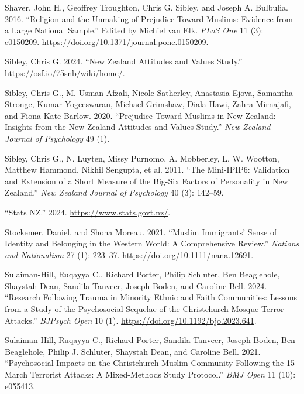\documentclass[
]{interact}
\newlength{\cslhangindent}
\newenvironment{CSLReferences}[2] %
 {\begin{list}{}{%
  \setlength{\itemindent}{0pt}
  \setlength{\leftmargin}{0pt}
  \setlength{\parsep}{0pt}
  \ifodd #1
   \setlength{\leftmargin}{\cslhangindent}
   \setlength{\itemindent}{-1\cslhangindent}
  \fi
  \setlength{\itemsep}{#2\baselineskip}}}
 {\end{list}}
\begin{document}
\begin{CSLReferences}{1}{0}
Shaver, John H., Geoffrey Troughton, Chris G. Sibley, and Joseph A.
Bulbulia. 2016. {``Religion and the Unmaking of Prejudice Toward
Muslims: Evidence from a Large National Sample.''} Edited by Michiel van
Elk. \emph{PLoS One} 11 (3): e0150209.
\url{https://doi.org/10.1371/journal.pone.0150209}.

Sibley, Chris G. 2024. {``New Zealand Attitudes and Values Study.''}
\url{https://osf.io/75snb/wiki/home/}.

Sibley, Chris G., M. Usman Afzali, Nicole Satherley, Anastasia Ejova,
Samantha Stronge, Kumar Yogeeswaran, Michael Grimshaw, Diala Hawi, Zahra
Mirnajafi, and Fiona Kate Barlow. 2020. {``Prejudice Toward {M}uslims in
{N}ew {Z}ealand: Insights from the {N}ew {Z}ealand {A}ttitudes and
{V}alues {S}tudy.''} \emph{New Zealand Journal of Psychology} 49 (1).

Sibley, Chris G., N. Luyten, Missy Purnomo, A. Mobberley, L. W. Wootton,
Matthew Hammond, Nikhil Sengupta, et al. 2011. {``The Mini-IPIP6:
Validation and Extension of a Short Measure of the {B}ig-{S}ix Factors
of Personality in {N}ew {Z}ealand.''} \emph{New Zealand Journal of
Psychology} 40 (3): 142--59.

{``Stats NZ.''} 2024. \url{https://www.stats.govt.nz/}.

Stockemer, Daniel, and Shona Moreau. 2021. {``Muslim Immigrants' Sense
of Identity and Belonging in the Western World: A Comprehensive
Review.''} \emph{Nations and Nationalism} 27 (1): 223--37.
\url{https://doi.org/10.1111/nana.12691}.

Sulaiman-Hill, Ruqayya C., Richard Porter, Philip Schluter, Ben
Beaglehole, Shaystah Dean, Sandila Tanveer, Joseph Boden, and Caroline
Bell. 2024. {``Research Following Trauma in Minority Ethnic and Faith
Communities: Lessons from a Study of the Psychosocial Sequelae of the
Christchurch Mosque Terror Attacks.''} \emph{BJPsych Open} 10 (1).
\url{https://doi.org/10.1192/bjo.2023.641}.

Sulaiman-Hill, Ruqayya C., Richard Porter, Sandila Tanveer, Joseph
Boden, Ben Beaglehole, Philip J. Schluter, Shaystah Dean, and Caroline
Bell. 2021. {``Psychosocial Impacts on the {C}hristchurch {M}uslim
Community Following the 15 March Terrorist Attacks: A Mixed-Methods
Study Protocol.''} \emph{BMJ Open} 11 (10): e055413.


\end{CSLReferences}
\end{document}
